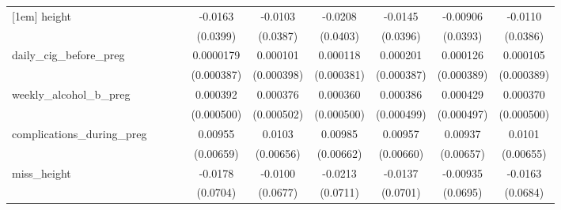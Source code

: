 \begin{table}[htbp]
\begin{tabular}{l*{9}{c}}
[1em]
height      &                     &                     &                     &     -0.0163         &     -0.0103         &     -0.0208         &     -0.0145         &    -0.00906         &     -0.0110         \\
            &                     &                     &                     &    (0.0399)         &    (0.0387)         &    (0.0403)         &    (0.0396)         &    (0.0393)         &    (0.0386)         \\
[1em]
daily\_cig\_before\_preg&                     &                     &                     &   0.0000179         &    0.000101         &    0.000118         &    0.000201         &    0.000126         &    0.000105         \\
            &                     &                     &                     &  (0.000387)         &  (0.000398)         &  (0.000381)         &  (0.000387)         &  (0.000389)         &  (0.000389)         \\
[1em]
weekly\_alcohol\_b\_preg&                     &                     &                     &    0.000392         &    0.000376         &    0.000360         &    0.000386         &    0.000429         &    0.000370         \\
            &                     &                     &                     &  (0.000500)         &  (0.000502)         &  (0.000500)         &  (0.000499)         &  (0.000497)         &  (0.000500)         \\
[1em]
complications\_during\_preg&                     &                     &                     &     0.00955         &      0.0103         &     0.00985         &     0.00957         &     0.00937         &      0.0101         \\
            &                     &                     &                     &   (0.00659)         &   (0.00656)         &   (0.00662)         &   (0.00660)         &   (0.00657)         &   (0.00655)         \\
[1em]
miss\_height &                     &                     &                     &     -0.0178         &     -0.0100         &     -0.0213         &     -0.0137         &    -0.00935         &     -0.0163         \\
            &                     &                     &                     &    (0.0704)         &    (0.0677)         &    (0.0711)         &    (0.0701)         &    (0.0695)         &    (0.0684)         \\

\end{tabular}
\end{table}
